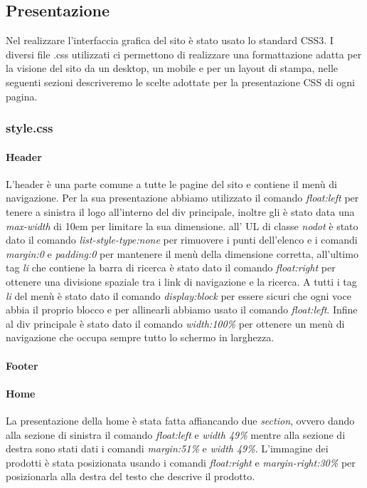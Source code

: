 \subsection{Presentazione}
Nel realizzare l'interfaccia grafica del sito è stato usato lo standard CSS3.\newline
I diversi file .css utilizzati ci permettono di realizzare una formattazione adatta per la visione del sito da un desktop, un mobile e per un layout di stampa, nelle seguenti sezioni descriveremo le scelte adottate per la presentazione CSS di ogni pagina.

\subsubsection{style.css}

\paragraph{Header} \mbox{}
L'header è una parte comune a tutte le pagine del sito e contiene il menù di navigazione. \newline Per la sua presentazione abbiamo utilizzato il comando \emph{float:left} per tenere a sinistra il logo all'interno del div principale, inoltre gli è stato data una \emph{max-width} di 10em per limitare la sua dimensione. all' UL di classe \emph{nodot} è stato dato il comando \emph{list-style-type:none} per rimuovere i punti dell'elenco e i comandi \emph{margin:0} e \emph{padding:0} per mantenere il menù della dimensione corretta, all'ultimo tag \emph{li} che contiene la barra di ricerca è stato dato il comando \emph{float:right} per ottenere una divisione spaziale tra i link di navigazione e la ricerca.
A tutti i tag \emph{li} del menù è stato dato il comando \emph{display:block} per essere sicuri che ogni voce abbia il proprio blocco e per allinearli abbiamo usato il comando \emph{float:left}.
Infine al div principale è stato dato il comando \emph{width:100\%} per ottenere un menù di navigazione che occupa sempre tutto lo schermo in larghezza.

\paragraph{Footer} \mbox{}



\paragraph{Home} \mbox{}
La presentazione della home è stata fatta affiancando due \emph{section}, ovvero dando alla sezione di sinistra il comando \emph{float:left} e \emph{width 49\%} mentre alla sezione di destra sono stati dati i comandi \emph{margin:51\%} e \emph{width 49\%}. 
L'immagine dei prodotti è stata posizionata usando i comandi \emph{float:right} e \emph{margin-right:30\%} per posizionarla alla destra del testo che descrive il prodotto.

